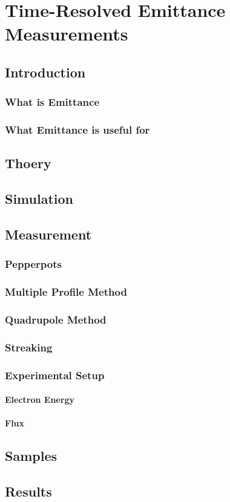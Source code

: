 \chapter{Time-Resolved Emittance Measurements}

\section{Introduction}

\subsection{What is Emittance}

\subsection{What Emittance is useful for}

\section{Thoery}

\section{Simulation}

\section{Measurement}

\subsection{Pepperpots}

\subsection{Multiple Profile Method}

\subsection{Quadrupole Method}

\subsection{Streaking}

\subsection{Experimental Setup}

\subsubsection{Electron Energy}

\subsubsection{Flux}

\section{Samples}

\section{Results}